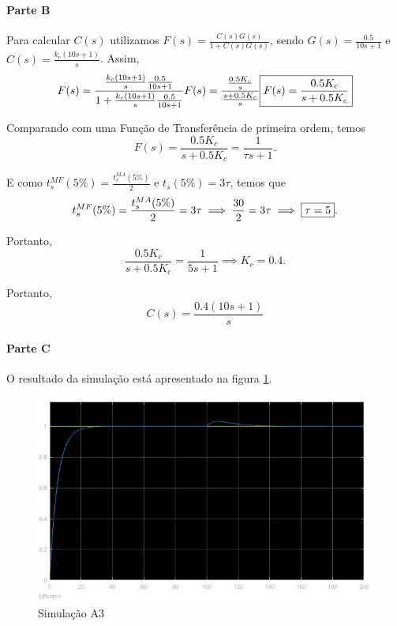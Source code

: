 \documentclass[
]{book}
\theoremstyle{definition}
\theoremstyle{definition}
\theoremstyle{definition}
\theoremstyle{remark}
\begin{document}
\hypertarget{parte-b}{%
\paragraph*{Parte B}\label{parte-b}}

Para calcular \(C(s)\) utilizamos \(F(s) = \frac{C(s)G(s)}{1+C(s)G(s)}\), sendo \(G(s) = \frac{0.5}{10s+1}\) e \(C(s) = \frac{k_c(10s+1)}{s}\). Assim,
\[
F(s) = \frac{\frac{k_c(10s+1)}{s}\frac{0.5}{10s+1}}{1+\frac{k_c(10s+1)}{s}\frac{0.5}{10s+1}} \\
F(s) = \frac{\frac{0.5K_c}{s}}{\frac{s+0.5K_c}{s}}\\
\boxed{F(s) = \frac{0.5K_c}{s+0.5K_c}}
\]

Comparando com uma Função de Transferência de primeira ordem, temos
\[
F(s) = \frac{0.5K_c}{s+0.5K_c} = \frac{1}{\tau s+1}.
\]

E como \(t_s^{MF}(5\%) = \frac{t_s^{MA}(5\%)}{2}\) e \(t_s(5\%) = 3\tau\), temos que
\[
t_s^{MF}(5\%) = \frac{t_s^{MA}(5\%)}{2} = 3\tau \\
\implies \frac{30}{2}=3\tau \\
\implies \boxed{\tau = 5}.
\]

Portanto,
\[
\frac{0.5K_c}{s+0.5K_c}=\frac{1}{5s+1}
\implies \boxed{K_c = 0.4}.
\]

Portanto,
\[
C(s) = \frac{0.4(10s+1)}{s}
\]

\hypertarget{parte-c}{%
\paragraph*{Parte C}\label{parte-c}}

O resultado da simulação está apresentado na figura \ref{fig:prob1C1}.

\begin{figure}

{\centering \includegraphics[width=0.8\linewidth]{Imagens/Lab5/Resolução/prob1C1} 

}

\caption{Simulação A3}\label{fig:prob1C1}
\end{figure}
\end{document}

